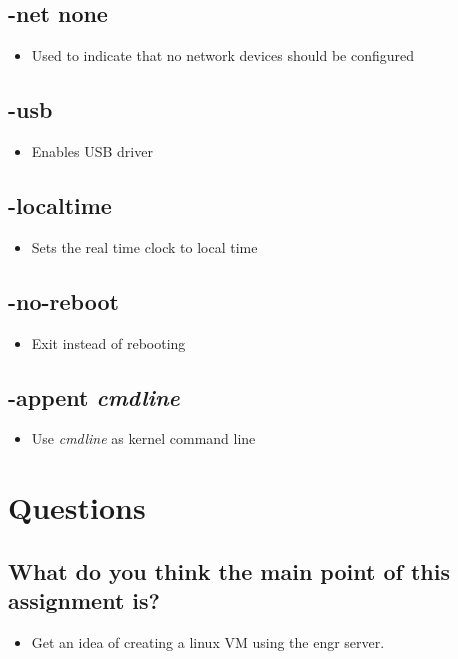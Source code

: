 \documentclass[a4paper, 10pt, draftclsnofoot, onecolumn]{article}
\begin{document}
\subsection{-net none}
\begin{itemize}
\item Used to indicate that no network devices should be configured
\end{itemize}

\subsection{-usb}
\begin{itemize}
\item Enables USB driver
\end{itemize}

\subsection{-localtime}
\begin{itemize}
\item Sets the real time clock to local time
\end{itemize}

\subsection{-no-reboot}
\begin{itemize}
\item Exit instead of rebooting
\end{itemize}

\subsection{-appent {\it cmdline}}
\begin{itemize}
\item Use {\it cmdline} as kernel command line
\end{itemize}

\section{Questions}
\subsection{What do you think the main point of this assignment is?}
\begin{itemize}
\item Get an idea of creating a linux VM using the engr server. 
\end{itemize}
\end{document}
